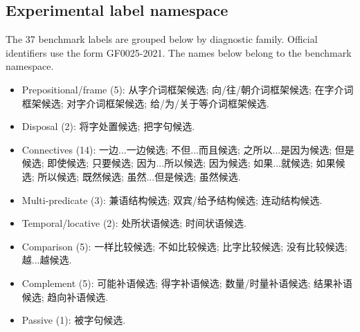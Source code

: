 \documentclass[pdflatex,sn-mathphys,NameDate]{sn-jnl}
\begin{document}
\begin{appendices}
\section{Experimental label namespace}
\label{app:labels}

The 37 benchmark labels are grouped below by diagnostic family.
Official identifiers use the form GF0025-2021.
The names below belong to the benchmark namespace.

\begin{itemize}
\item Prepositional/frame (5): 从字介词框架候选; 向/往/朝介词框架候选; 在字介词框架候选; 对字介词框架候选; 给/为/关于等介词框架候选.
\item Disposal (2): 将字处置候选; 把字句候选.
\item Connectives (14): 一边...一边候选; 不但...而且候选; 之所以...是因为候选; 但是候选; 即使候选; 只要候选; 因为...所以候选; 因为候选; 如果...就候选; 如果候选; 所以候选; 既然候选; 虽然...但是候选; 虽然候选.
\item Multi-predicate (3): 兼语结构候选; 双宾/给予结构候选; 连动结构候选.
\item Temporal/locative (2): 处所状语候选; 时间状语候选.
\item Comparison (5): 一样比较候选; 不如比较候选; 比字比较候选; 没有比较候选; 越...越候选.
\item Complement (5): 可能补语候选; 得字补语候选; 数量/时量补语候选; 结果补语候选; 趋向补语候选.
\item Passive (1): 被字句候选.
\end{itemize}
\end{appendices}


\end{document}
